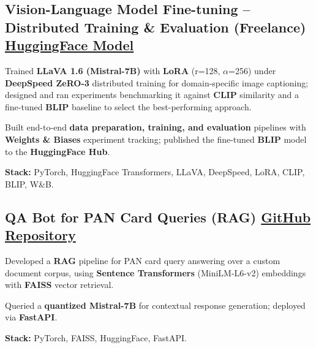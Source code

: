 \documentclass[letter,10pt]{article}
\begin{document}
\subsection{Vision-Language Model Fine-tuning – Distributed Training \& Evaluation (Freelance) \hfill \href{https://huggingface.co/sunil448832/blip-model}{HuggingFace Model}}
\begin{zitemize}
\item Trained \textbf{LLaVA 1.6 (Mistral-7B)} with \textbf{LoRA} (r=128, $\alpha$=256) under \textbf{DeepSpeed ZeRO-3} distributed training for domain-specific image captioning; designed and ran experiments benchmarking it against \textbf{CLIP} similarity and a fine-tuned \textbf{BLIP} baseline to select the best-performing approach.
\item Built end-to-end \textbf{data preparation, training, and evaluation} pipelines with \textbf{Weights \& Biases} experiment tracking; published the fine-tuned \textbf{BLIP} model to the \textbf{HuggingFace Hub}.
\item \textbf{Stack:} PyTorch, HuggingFace Transformers, LLaVA, DeepSpeed, LoRA, CLIP, BLIP, W\&B.
\end{zitemize}

\subsection{QA Bot for PAN Card Queries (RAG) \hfill \href{https://github.com/sunil448832/Natural-Language-Processing/tree/master/RAG(Retrieval\%20Augment\%20Generation)}{GitHub Repository}}
\begin{zitemize}
\item Developed a \textbf{RAG} pipeline for PAN card query answering over a custom document corpus, using \textbf{Sentence Transformers} (MiniLM-L6-v2) embeddings with \textbf{FAISS} vector retrieval.
\item Queried a \textbf{quantized Mistral-7B} for contextual response generation; deployed via \textbf{FastAPI}.
\item \textbf{Stack:} PyTorch, FAISS, HuggingFace, FastAPI.
\end{zitemize}
\end{document}
